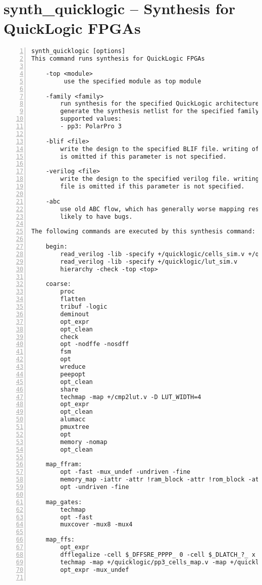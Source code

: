 \section{synth\_quicklogic -- Synthesis for QuickLogic FPGAs}
\label{cmd:synth_quicklogic}
\begin{lstlisting}[numbers=left,frame=single]
   synth_quicklogic [options]
This command runs synthesis for QuickLogic FPGAs

    -top <module>
         use the specified module as top module

    -family <family>
        run synthesis for the specified QuickLogic architecture
        generate the synthesis netlist for the specified family.
        supported values:
        - pp3: PolarPro 3 

    -blif <file>
        write the design to the specified BLIF file. writing of an output file
        is omitted if this parameter is not specified.

    -verilog <file>
        write the design to the specified verilog file. writing of an output
        file is omitted if this parameter is not specified.

    -abc
        use old ABC flow, which has generally worse mapping results but is less
        likely to have bugs.

The following commands are executed by this synthesis command:

    begin:
        read_verilog -lib -specify +/quicklogic/cells_sim.v +/quicklogic/pp3_cells_sim.v
        read_verilog -lib -specify +/quicklogic/lut_sim.v
        hierarchy -check -top <top>

    coarse:
        proc
        flatten
        tribuf -logic
        deminout
        opt_expr
        opt_clean
        check
        opt -nodffe -nosdff
        fsm
        opt
        wreduce
        peepopt
        opt_clean
        share
        techmap -map +/cmp2lut.v -D LUT_WIDTH=4
        opt_expr
        opt_clean
        alumacc
        pmuxtree
        opt
        memory -nomap
        opt_clean

    map_ffram:
        opt -fast -mux_undef -undriven -fine
        memory_map -iattr -attr !ram_block -attr !rom_block -attr logic_block -attr syn_ramstyle=auto -attr syn_ramstyle=registers -attr syn_romstyle=auto -attr syn_romstyle=logic
        opt -undriven -fine

    map_gates:
        techmap
        opt -fast
        muxcover -mux8 -mux4

    map_ffs:
        opt_expr
        dfflegalize -cell $_DFFSRE_PPPP_ 0 -cell $_DLATCH_?_ x
        techmap -map +/quicklogic/pp3_cells_map.v -map +/quicklogic/pp3_ffs_map.v
        opt_expr -mux_undef


\end{lstlisting}
